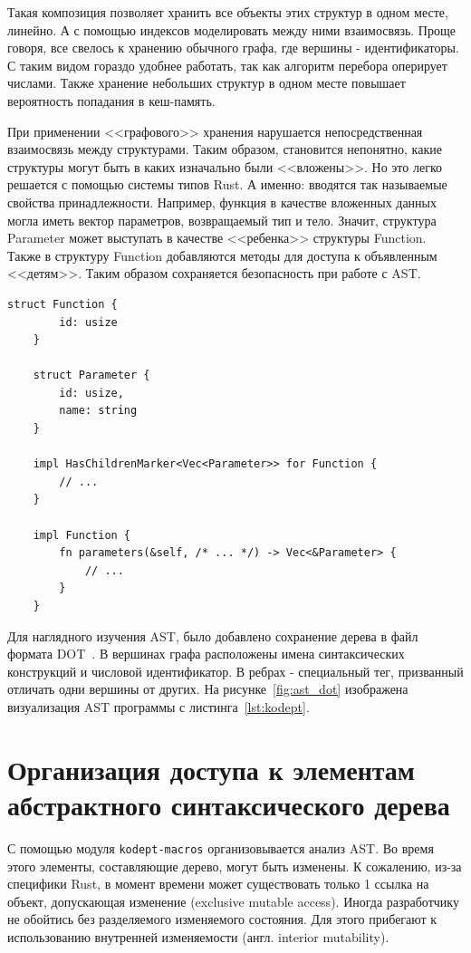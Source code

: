 Такая композиция позволяет хранить все объекты этих структур в одном месте, линейно.
А с помощью индексов моделировать между ними взаимосвязь.
Проще говоря, все свелось к хранению обычного графа, где вершины - идентификаторы.
С таким видом гораздо удобнее работать, так как алгоритм перебора оперирует числами.
Также хранение небольших структур в одном месте повышает вероятность попадания в кеш-память.

При применении <<графового>> хранения нарушается непосредственная взаимосвязь между структурами.
Таким образом, становится непонятно, какие структуры могут быть в каких изначально были <<вложены>>.
Но это легко решается с помощью системы типов Rust.
А именно: вводятся так называемые свойства принадлежности.
Например, функция в качестве вложенных данных могла иметь вектор параметров, возвращаемый тип и тело.
Значит, структура Parameter может выступать в качестве <<ребенка>> структуры Function.
Также в структуру Function добавляются методы для доступа к объявленным <<детям>>.
Таким образом сохраняется безопасность при работе с AST.

\begin{lstlisting}[label=lst:node, caption={Упрощенное представление структур после всех доработок на языке Rust}]
    struct Function {
        id: usize
    }

    struct Parameter {
        id: usize,
        name: string
    }

    impl HasChildrenMarker<Vec<Parameter>> for Function {
        // ...
    }

    impl Function {
        fn parameters(&self, /* ... */) -> Vec<&Parameter> {
            // ...
        }
    }
\end{lstlisting}

Для наглядного изучения AST, было добавлено сохранение дерева в файл формата DOT~\cite{Dot}.
В вершинах графа расположены имена синтаксических конструкций и числовой идентификатор.
В ребрах - специальный тег, призванный отличать одни вершины от других.
На рисунке~\ref{fig:ast_dot} изображена визуализация AST программы с листинга~\ref{lst:kodept}.

\section{Организация доступа к элементам абстрактного синтаксического дерева}
\label{sec:ast_access}

С помощью модуля \lstinline{kodept-macros} организовывается анализ AST.
Во время этого элементы, составляющие дерево, могут быть изменены.
К сожалению, из-за специфики Rust, в момент времени может существовать только 1 ссылка на объект, допускающая изменение (exclusive mutable access).
Иногда разработчику не обойтись без разделяемого изменяемого состояния.
Для этого прибегают к использованию внутренней изменяемости (англ. interior mutability).

